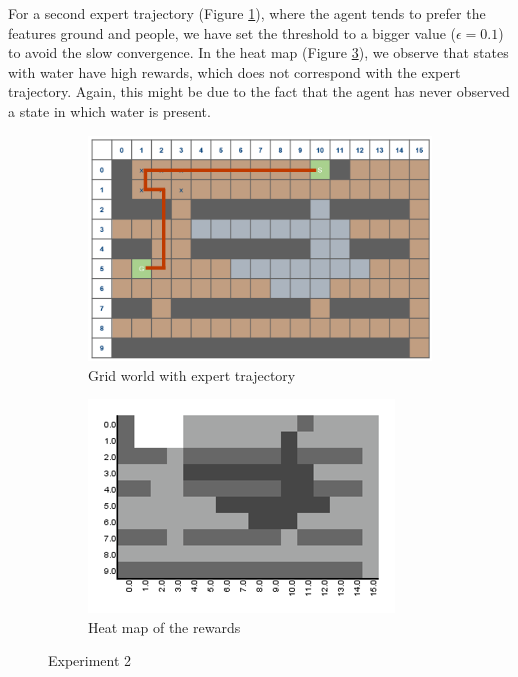 \documentclass[10pt,a4paper,twocolumn]{article}
\begin{document}
\newpage

For a second expert trajectory (Figure \ref{fig:experiment2trajectory}), where the agent tends to prefer the features ground and people, we have set the threshold to a bigger value ($\epsilon= 0.1$) to avoid the slow convergence. In the heat map (Figure \ref{fig:experiment2heatmap}), we observe that states with water have high rewards, which does not correspond with the expert trajectory. Again, this might be due to the fact that the agent has never observed a state in which water is present.

\begin{figure}[h]
\begin{subfigure}[b]{0.5\textwidth}
	\includegraphics[width=\textwidth]{experiment_2_gridworld}
	\caption{Grid world with expert trajectory}
	\label{fig:experiment2trajectory}
\end{subfigure}
\begin{subfigure}[b]{0.5\textwidth}
	\includegraphics[width=\textwidth]{experiment_2_heatmap}
	\caption{Heat map of the rewards}
	\label{fig:experiment2heatmap}
\end{subfigure}
\caption{Experiment 2}
\end{figure}
\end{document}
